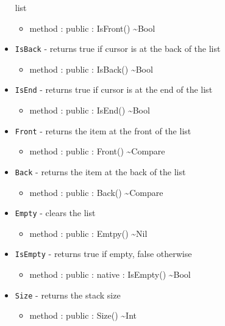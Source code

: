 \documentclass[11pt]{article}
\begin{document}
\begin{itemize}
  list
  \begin{itemize}
  \item method : public : IsFront() \textasciitilde Bool
  \end{itemize}
\item \texttt{IsBack} - returns true if cursor is at the back of the
  list
  \begin{itemize}
  \item method : public : IsBack() \textasciitilde Bool
  \end{itemize}
\item \texttt{IsEnd} - returns true if cursor is at the end of the
  list
  \begin{itemize}
  \item method : public : IsEnd() \textasciitilde Bool
  \end{itemize}
\item \texttt{Front} - returns the item at the front of the list
  \begin{itemize}
  \item method : public : Front() \textasciitilde Compare
  \end{itemize}
\item \texttt{Back} - returns the item at the back of the list
  \begin{itemize}
  \item method : public : Back() \textasciitilde Compare
  \end{itemize}
\item \texttt{Empty} - clears the list
  \begin{itemize}
  \item method : public : Emtpy() \textasciitilde Nil
  \end{itemize}
\item \texttt{IsEmpty} - returns true if empty, false otherwise
  \begin{itemize}
  \item method : public : native : IsEmpty() \textasciitilde Bool
  \end{itemize}
\item \texttt{Size} - returns the stack size
  \begin{itemize}
  \item method : public : Size() \textasciitilde Int
  \end{itemize}
\end{itemize}
\end{document}
